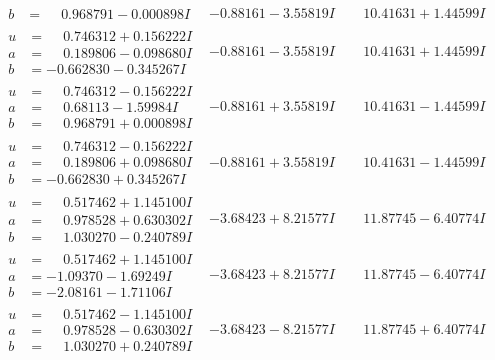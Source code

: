 \documentclass[1p]{elsarticle_modified}
\theoremstyle{definition}
\begin{document}
$$\begin{array}{c|c|c}
\begin{aligned}
b &= \phantom{-}0.968791 - 0.000898 I\end{aligned}
 & -0.88161 - 3.55819 I & \phantom{-}10.41631 + 1.44599 I \\ \hline\begin{aligned}
u &= \phantom{-}0.746312 + 0.156222 I \\
a &= \phantom{-}0.189806 - 0.098680 I \\
b &= -0.662830 - 0.345267 I\end{aligned}
 & -0.88161 - 3.55819 I & \phantom{-}10.41631 + 1.44599 I \\ \hline\begin{aligned}
u &= \phantom{-}0.746312 - 0.156222 I \\
a &= \phantom{-}0.68113 - 1.59984 I \\
b &= \phantom{-}0.968791 + 0.000898 I\end{aligned}
 & -0.88161 + 3.55819 I & \phantom{-}10.41631 - 1.44599 I \\ \hline\begin{aligned}
u &= \phantom{-}0.746312 - 0.156222 I \\
a &= \phantom{-}0.189806 + 0.098680 I \\
b &= -0.662830 + 0.345267 I\end{aligned}
 & -0.88161 + 3.55819 I & \phantom{-}10.41631 - 1.44599 I \\ \hline\begin{aligned}
u &= \phantom{-}0.517462 + 1.145100 I \\
a &= \phantom{-}0.978528 + 0.630302 I \\
b &= \phantom{-}1.030270 - 0.240789 I\end{aligned}
 & -3.68423 + 8.21577 I & \phantom{-}11.87745 - 6.40774 I \\ \hline\begin{aligned}
u &= \phantom{-}0.517462 + 1.145100 I \\
a &= -1.09370 - 1.69249 I \\
b &= -2.08161 - 1.71106 I\end{aligned}
 & -3.68423 + 8.21577 I & \phantom{-}11.87745 - 6.40774 I \\ \hline\begin{aligned}
u &= \phantom{-}0.517462 - 1.145100 I \\
a &= \phantom{-}0.978528 - 0.630302 I \\
b &= \phantom{-}1.030270 + 0.240789 I\end{aligned}
 & -3.68423 - 8.21577 I & \phantom{-}11.87745 + 6.40774 I \\ \hline\begin{aligned}

\end{aligned}
\end{array}$$
\end{document}

